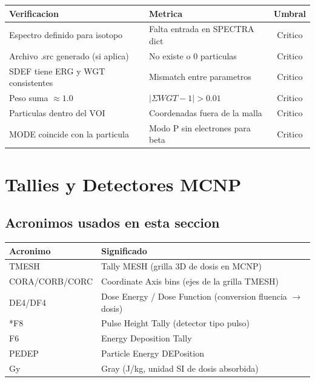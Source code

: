 \documentclass[12pt,a4paper]{article}
\begin{document}
\begin{table}[H]
\centering
\begin{tabular}{llc}
\toprule
\textbf{Verificacion} & \textbf{Metrica} & \textbf{Umbral} \\
\midrule
Espectro definido para isotopo & Falta entrada en SPECTRA dict & Critico \\
Archivo .src generado (si aplica) & No existe o 0 particulas & Critico \\
SDEF tiene ERG y WGT consistentes & Mismatch entre parametros & Critico \\
Peso suma $\approx 1.0$ & $|\Sigma WGT - 1| > 0.01$ & Critico \\
Particulas dentro del VOI & Coordenadas fuera de la malla & Critico \\
MODE coincide con la particula & Modo P sin electrones para beta & Critico \\
\bottomrule
\end{tabular}
\end{table}

\newpage

\section{Tallies y Detectores MCNP}
\label{sec:tallies}

\subsection*{Acronimos usados en esta seccion}
\begin{tabular}{ll}
\toprule
\textbf{Acronimo} & \textbf{Significado} \\
\midrule
TMESH & Tally MESH (grilla 3D de dosis en MCNP) \\
CORA/CORB/CORC & Coordinate Axis bins (ejes de la grilla TMESH) \\
DE4/DF4 & Dose Energy / Dose Function (conversion fluencia $\to$ dosis) \\
*F8 & Pulse Height Tally (detector tipo pulso) \\
F6 & Energy Deposition Tally \\
PEDEP & Particle Energy DEPosition \\
Gy & Gray (J/kg, unidad SI de dosis absorbida) \\
\bottomrule
\end{tabular}
\end{document}
